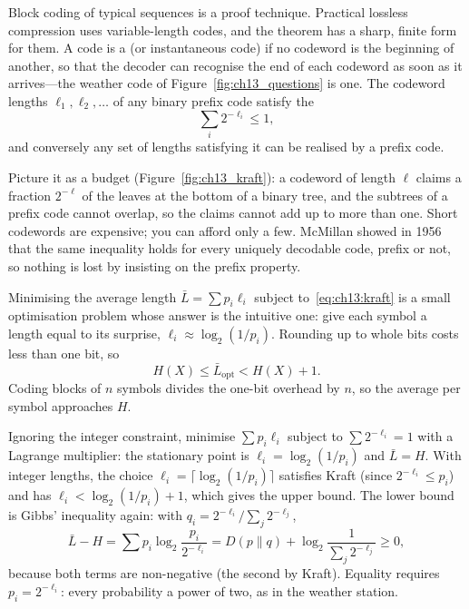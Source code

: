 Block coding of typical sequences is a proof technique. Practical lossless compression uses
variable-length codes, and the theorem has a sharp, finite form for them. A code is a
 (or instantaneous code) if no codeword is the beginning of another, so that the
decoder can recognise the end of each codeword as soon as it arrives---the weather code of
Figure~\ref{fig:ch13_questions} is one. The codeword lengths $\ell_1,\ell_2,\ldots$ of any binary
prefix code satisfy the 
\begin{equation}
\sum_i2^{-\ell_i}\le1,
\label{eq:ch13:kraft}
\end{equation}
and conversely any set of lengths satisfying it can be realised by a prefix code.


Picture it as a budget (Figure~\ref{fig:ch13_kraft}): a codeword of length $\ell$ claims a
fraction $2^{-\ell}$ of the leaves at the bottom of a binary tree, and the subtrees of a prefix
code cannot overlap, so the claims cannot add up to more than one. Short codewords are expensive;
you can afford only a few. McMillan showed in 1956 that the same inequality holds for every
uniquely decodable code, prefix or not, so nothing is lost by insisting on the prefix property.

Minimising the average length $\bar L=\sum p_i\ell_i$ subject to~\eqref{eq:ch13:kraft} is a small
optimisation problem whose answer is the intuitive one: give each symbol a length equal to its
surprise, $\ell_i\approx\log_2(1/p_i)$. Rounding up to whole bits costs less than one bit, so
\begin{equation}
H(X)\le\bar L_{\text{opt}}<H(X)+1.
\label{eq:ch13:lbound}
\end{equation}
Coding blocks of $n$ symbols divides the one-bit overhead by $n$, so the average per symbol
approaches $H$.

\begin{deeper}
Ignoring the integer constraint, minimise $\sum p_i\ell_i$ subject to $\sum2^{-\ell_i}=1$ with a
Lagrange multiplier: the stationary point is $\ell_i=\log_2(1/p_i)$ and $\bar L=H$. With integer
lengths, the choice $\ell_i=\lceil\log_2(1/p_i)\rceil$ satisfies Kraft (since
$2^{-\ell_i}\le p_i$) and has $\ell_i<\log_2(1/p_i)+1$, which gives the upper bound. The lower
bound is Gibbs' inequality again: with $q_i=2^{-\ell_i}/\sum_j2^{-\ell_j}$,
\[
\bar L-H=\sum p_i\log_2\frac{p_i}{2^{-\ell_i}}=D(p\|q)+\log_2\frac1{\sum_j2^{-\ell_j}}\ge0,
\]
because both terms are non-negative (the second by Kraft). Equality requires $p_i=2^{-\ell_i}$:
every probability a power of two, as in the weather station.
\end{deeper}

